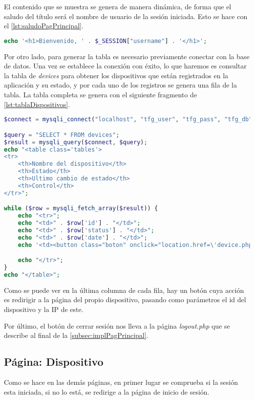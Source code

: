 El contenido que se muestra se genera de manera dinámica, de forma que el saludo del título será el nombre de usuario de la sesión iniciada. Esto se hace con el \autoref{lst:saludoPagPrincipal}.
\pagebreak

\begin{lstlisting}[language=PHP, caption=Saludo página principal, label=lst:saludoPagPrincipal]
echo '<h1>Bienvenido, ' . $_SESSION["username"] . '</h1>';
\end{lstlisting}

Por otro lado, para generar la tabla es necesario previamente conectar con la base de datos. Una vez se establece la conexión con éxito, lo que haremos es consultar la tabla de \textit{devices} para obtener los dispositivos que están registrados en la aplicación y su estado, y por cada uno de los registros se genera una fila de la tabla. La tabla completa se genera con el siguiente fragmento de \autoref{lst:tablaDispositivos}.
\begin{lstlisting}[language=PHP, caption=Visualización de tabla de dispositivos, label=lst:tablaDispositivos]
$connect = mysqli_connect("localhost", "tfg_user", "tfg_pass", "tfg_db");

$query = "SELECT * FROM devices";
$result = mysqli_query($connect, $query);
echo "<table class='tables'>
<tr>
    <th>Nombre del dispositivo</th>
    <th>Estado</th>
    <th>Ultimo cambio de estado</th>
    <th>Control</th>
</tr>";

while ($row = mysqli_fetch_array($result)) {
    echo "<tr>";
    echo "<td>" . $row['id'] . "</td>";
    echo "<td>" . $row['status'] . "</td>";
    echo "<td>" . $row['date'] . "</td>";
    echo '<td><button class="boton" onclick="location.href=\'device.php?id=' . $row['id'] . '&ip=' . $row['ip'] . '\'">Acceder</button></td>';

    echo "</tr>";
}
echo "</table>";
\end{lstlisting}

Como se puede ver en la última columna de cada fila, hay un botón cuya acción es redirigir a la página del propio dispositivo, pasando como parámetros el id del dispositivo y la IP de este.

Por último, el botón de cerrar sesión nos lleva a la página \textit{logout.php} que se describe al final de la \autoref{subsec:implPagPrincipal}.

\subsection{Página: Dispositivo}\label{subsec:página-dispositivo}
Como se hace en las demás páginas, en primer lugar se comprueba si la sesión esta iniciada, si no lo está, se redirige a la página de inicio de sesión.

